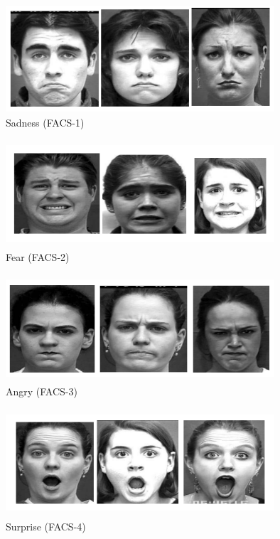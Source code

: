 \documentclass[a4paper,12pt,oneside]{article}
\begin{document}
\begin{figure}[H]
\centering
\includegraphics[height=4cm,width=10cm]{sad.jpg}
\caption{Sadness (FACS-1)}
\end{figure}



\begin{figure}[H]
\centering
\includegraphics[height=4cm,width=10cm]{fear.jpg}
\caption{Fear (FACS-2)}
\end{figure}


\begin{figure}[H]
\centering
\includegraphics[height=4cm,width=10cm]{angry.jpg}
\caption{Angry (FACS-3)}
\end{figure}




\begin{figure}[H]
\centering
\includegraphics[height=4cm,width=10cm]{surprise.jpg}
\caption{Surprise (FACS-4)}
\end{figure}
\end{document}
